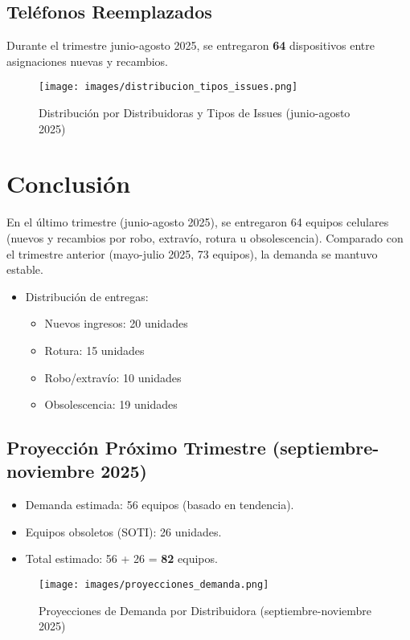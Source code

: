 \documentclass[a4paper,12pt]{article}
\begin{document}
\subsection{Teléfonos Reemplazados}
Durante el trimestre junio-agosto 2025, se entregaron \textbf{64} dispositivos entre asignaciones nuevas y recambios.

\begin{figure}[h]
    \centering
    \texttt{[image: images/distribucion\_tipos\_issues.png]}
    \caption{Distribución por Distribuidoras y Tipos de Issues (junio-agosto 2025)}
\end{figure}

\section{Conclusión}
En el último trimestre (junio-agosto 2025), se entregaron 64 equipos celulares (nuevos y recambios por robo, extravío, rotura u obsolescencia). Comparado con el trimestre anterior (mayo-julio 2025, 73 equipos), la demanda se mantuvo estable.
\begin{itemize}
    \item Distribución de entregas:
    \begin{itemize}
        \item Nuevos ingresos: 20 unidades
        \item Rotura: 15 unidades
        \item Robo/extravío: 10 unidades
        \item Obsolescencia: 19 unidades
    \end{itemize}
\end{itemize}

\subsection{Proyección Próximo Trimestre (septiembre-noviembre 2025)}
\begin{itemize}
    \item Demanda estimada: 56 equipos (basado en tendencia).
    \item Equipos obsoletos (SOTI): 26 unidades.
    \item Total estimado: 56 + 26 = \textbf{82} equipos.
\end{itemize}

\begin{figure}[h]
    \centering
    \texttt{[image: images/proyecciones\_demanda.png]}
    \caption{Proyecciones de Demanda por Distribuidora (septiembre-noviembre 2025)}
\end{figure}
\end{document}
